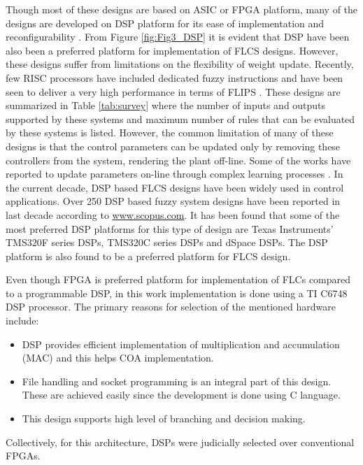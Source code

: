 Though most of these designs are based on ASIC or FPGA platform, many of the designs are developed on DSP platform for its ease of implementation and reconfigurability \cite{AlNabulsi2012,Kalaykov1999,Mustafa2010,Rubaai2007,Gai2010,Uddin2007,Mohanasundaram201187,wangHuang2013,Maji2013,maji2012design}. From Figure \ref{fig:Fig3_DSP} it is evident that DSP have been also been a preferred platform for implementation of FLCS designs. However, these designs suffer from limitations on the flexibility of weight update. Recently, few RISC processors have included dedicated fuzzy instructions and have been seen to deliver a very high performance in terms of FLIPS \cite{Salapura1998,Watanabe1996,Brox2006,bookGoos2003}. These designs are summarized in Table \ref{tab:survey} where the number of inputs and outputs supported by these systems and maximum number of rules that can be evaluated by these systems is listed. However, the common limitation of many of these designs is that the control parameters can be updated only by removing these controllers from the system, rendering the plant off\hyp{}line. Some of the works have reported to update parameters on\hyp{}line through complex learning processes \cite{Munoz-Salinas2008,Alcala2006,Bandyopadhyay2001a,Boubertakh2010,Demir2011b}. 
In the current decade, DSP based FLCS designs have been widely used in control applications\cite{Heber1997,Butt2004,Suetake2011,Uddin2006}. Over 250 DSP based fuzzy system designs have been reported in last decade according to \url{www.scopus.com}. It has been found that some of the most preferred DSP platforms for this type of design are Texas Instruments' TMS320F series DSPs\cite{Rahmani2013,Pu2014,Eskandarian2014,ElKhateb2014,Okumus2014,Hung2015}, TMS320C series DSPs\cite{Sousa1995,Mustafa2010,Uddin2006,Gai2010,Uddin2007} and dSpace DSPs\cite{MatIsa2012,Noman2013,Rafa2014,Rubaai2007,Butt2004}. The DSP platform is also found to be a preferred platform for FLCS design. 

Even though FPGA is preferred platform for implementation of FLCs compared to a programmable DSP, in this work implementation is done using a TI C6748 DSP processor.  The primary reasons for selection of the mentioned hardware include:
\begin{itemize}
	\item DSP provides efficient implementation of multiplication and accumulation (MAC) and this helps COA implementation.
	\item File handling and socket programming is an integral part of this design. These are achieved easily since the development is done using C language.
	\item This design supports high level of branching and decision making.
\end{itemize}	
Collectively, for this architecture, DSPs were judicially selected over conventional FPGAs. 

